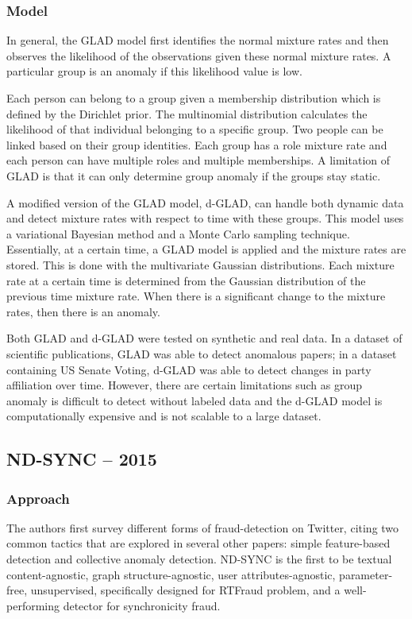 \documentclass[11pt, oneside]{article}   	%
\begin{document}
\subsubsection*{Model}

\quad In general, the GLAD model first identifies the normal mixture rates and then observes the likelihood of the observations given these normal mixture rates.
A particular group is an anomaly if this likelihood value is low.

\quad Each person can belong to a group given a membership distribution which is defined by the Dirichlet prior.
The multinomial distribution calculates the likelihood of that individual belonging to a specific group.
Two people can be linked based on their group identities.
Each group has a role mixture rate and each person can have multiple roles and multiple memberships.
A limitation of GLAD is that it can only determine group anomaly if the groups stay static.

\quad A modified version of the GLAD model, d-GLAD, can handle both dynamic data and detect mixture rates with respect to time with these groups.
This model uses a variational Bayesian method and a Monte Carlo sampling technique.
Essentially, at a certain time, a GLAD model is applied and the mixture rates are stored.
This is done with the multivariate Gaussian distributions.
Each mixture rate at a certain time is determined from the Gaussian distribution of the previous time mixture rate.
When there is a significant change to the mixture rates, then there is an anomaly.

\quad Both GLAD and d-GLAD were tested on synthetic and real data.
In a dataset of scientific publications, GLAD was able to detect anomalous papers; in a dataset containing US Senate Voting, d-GLAD was able to detect changes in party affiliation over time.
However, there are certain limitations such as group anomaly is difficult to detect without labeled data and the d-GLAD model is computationally expensive and is not scalable to a large dataset.

\subsection*{ND-SYNC -- 2015}

\subsubsection*{Approach}

\quad The authors first survey different forms of fraud-detection on Twitter, citing two common tactics that are explored in several other papers: simple feature-based detection and collective anomaly detection.
ND-SYNC is the first to be textual content-agnostic, graph structure-agnostic, user attributes-agnostic, parameter-free, unsupervised, specifically designed for RTFraud problem, and a well-performing detector for synchronicity fraud.
\end{document}
